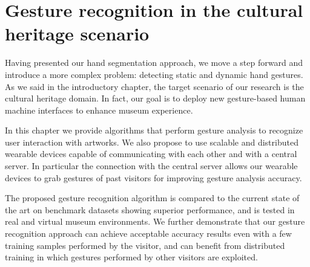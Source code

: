 
\chapter{Gesture recognition in the cultural heritage scenario}


Having presented our hand segmentation approach, we move a step forward and introduce a more complex problem: detecting static and dynamic hand gestures. As we said in the introductory chapter, the target scenario of our research is the cultural heritage domain. In fact, our goal is to deploy new gesture-based human machine interfaces to enhance museum experience.

In this chapter we provide algorithms that perform gesture analysis to recognize user interaction with artworks. We also propose to use scalable and distributed wearable devices capable of communicating with each other and with a central server. In particular the connection with the central server allows our wearable devices to grab gestures of past visitors for improving gesture analysis accuracy.

The proposed gesture recognition algorithm is compared to the current state of the art on benchmark datasets showing superior performance, and is tested in real and virtual museum environments. We further demonstrate that our gesture recognition approach can achieve acceptable accuracy results even with a few training samples performed by the visitor, and can benefit from distributed training in which gestures performed by other visitors are exploited.


